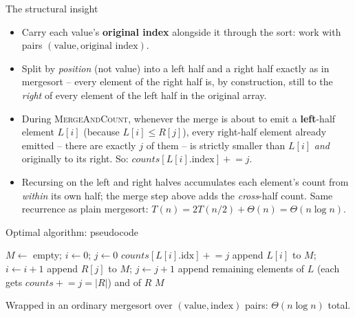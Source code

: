 \documentclass[11pt,aspectratio=169]{beamer}
\begin{document}
\begin{frame}{The structural insight}
  \begin{itemize}
    \item Carry each value's \textbf{original index} alongside it through the sort:
    work with pairs $(\text{value}, \text{original index})$.
    \item Split by \emph{position} (not value) into a left half and a right half exactly as
    in mergesort -- every element of the right half is, by construction, still to the
    \emph{right} of every element of the left half in the original array.
    \item During \textsc{MergeAndCount}, whenever the merge is about to emit a
    \textbf{left}-half element $L[i]$ (because $L[i] \le R[j]$), every right-half element
    already emitted -- there are exactly $j$ of them -- is strictly smaller than $L[i]$
    \emph{and} originally to its right. So: $counts[L[i].\text{index}] \mathrel{+}= j$.
    \item Recursing on the left and right halves accumulates each element's count from
    \emph{within} its own half; the merge step above adds the \emph{cross}-half count.
    Same recurrence as plain mergesort: $T(n) = 2T(n/2) + \Theta(n) = \Theta(n \log n)$.
  \end{itemize}
\end{frame}

\begin{frame}{Optimal algorithm: pseudocode}
  \footnotesize
  \begin{algorithmic}[1]
     
      \State $M \gets$ empty; $i \gets 0$; $j \gets 0$
          \State $counts[L[i].\text{idx}] \mathrel{+}= j$ 
          \State append $L[i]$ to $M$; $i \gets i+1$
        \Else
          \State append $R[j]$ to $M$; $j \gets j+1$
        \EndIf
      \EndWhile
      \State append remaining elements of $L$ (each gets $counts \mathrel{+}= j = |R|$) and of $R$
      \State \Return $M$
    \EndFunction
  \end{algorithmic}
  Wrapped in an ordinary mergesort over $(\text{value}, \text{index})$ pairs:
  $\Theta(n \log n)$ total.
\end{frame}
\end{document}

